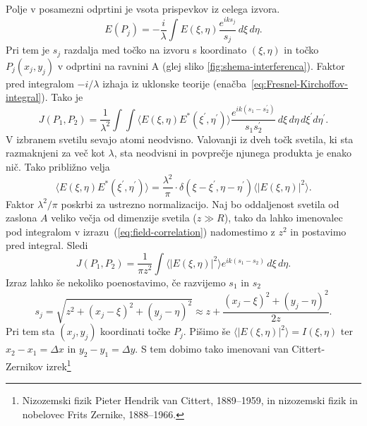 Polje v posamezni odprtini je vsota prispevkov iz celega izvora.
\begin{equation}
E(P_{j})=-\frac{i}{\lambda}\int E(\xi,\eta)\frac{e^{iks_{j}}}{s_{j}}\, d\xi\, d\eta.
\end{equation}
Pri tem je $s_{j}$ razdalja med točko na izvoru s koordinato $(\xi,\eta)$  in točko
$P_{j}(x_{j},y_{j})$ v odprtini na ravnini A (glej sliko \ref{fig:shema-interferenca}).
Faktor pred integralom $-i/\lambda$ izhaja iz uklonske teorije (enačba~\ref{eq:Fresnel-Kirchoffov-integral}).
Tako je 
\begin{equation}
J(P_{1},P_{2})=\frac{1}{\lambda^{2}}\int\int\langle E(\xi,\eta)E^{*}(\xi^{\prime},\eta^{\prime})\rangle\frac{e^{ik(s_{1}-s_{2}^{\prime})}}{s_{1}s_{2}^{\prime}}\, d\xi\, d\eta\, d\xi^{\prime}d\eta^{\prime}.\label{eq:field-correlation}
\end{equation}
V izbranem svetilu sevajo atomi neodvisno. Valovanji iz dveh točk svetila,
ki sta razmaknjeni za več kot $\lambda$, sta neodvisni in povprečje
njunega produkta je enako nič. Tako približno velja 
\begin{equation}
\langle E(\xi,\eta)E^{*}(\xi^{\prime},\eta^{\prime})\rangle=\frac{\lambda^{2}}{\pi} \cdot \delta(\xi-\xi^{\prime},\eta-\eta^{\prime})\langle|E(\xi,\eta)|^{2}\rangle.
\label{eq:delta-Zernike}
\end{equation}
Faktor $\lambda^{2}/\pi$ poskrbi za ustrezno normalizacijo. 
Naj bo oddaljenost svetila od zaslona $A$
veliko večja od dimenzije svetila ($z\gg R$), tako da lahko imenovalec pod integralom
v izrazu~(\ref{eq:field-correlation}) nadomestimo z $z^{2}$ in postavimo
pred integral. Sledi
\begin{equation}
J(P_{1},P_{2})=\frac{1}{\pi z^{2}}\int\langle|E(\xi,\eta)|^{2}\rangle e^{ik(s_{1}-s_{2})}\, d\xi\, d\eta.\label{eq:Zernike1}
\end{equation}
Izraz lahko še nekoliko poenostavimo, če razvijemo $s_{1}$
in $s_{2}$ 
\begin{equation}
s_{j}=\sqrt{z^{2}+(x_{j}-\xi)^{2}+(y_{j}-\eta)^{2}}\approx z+\frac{(x_{j}-\xi)^{2}+(y_{j}-\eta)^{2}}{2z}.
\end{equation}
Pri tem sta $(x_{j},y_{j})$ koordinati točke $P_{j}$. Pišimo 
še $\langle|E(\xi,\eta)|^{2}\rangle=I(\xi,\eta)$ ter $x_{2}-x_{1}=\Delta x$
in $y_{2}-y_{1}=\Delta y$. S tem dobimo tako imenovani 
van Cittert-Zernikov izrek\footnote{Nizozemski fizik Pieter Hendrik van Cittert, 1889--1959, in 
nizozemski fizik in nobelovec Frits Zernike, 1888--1966.}

